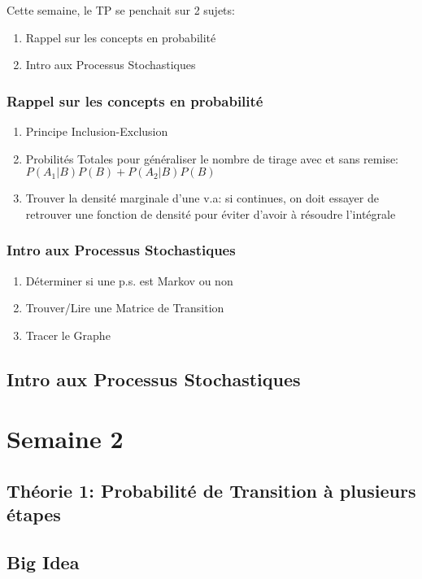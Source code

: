 \documentclass{article}
\begin{document}
Cette semaine, le TP se penchait sur 2 sujets:
\begin{enumerate}
    \item Rappel sur les concepts en probabilité
    \item Intro aux Processus Stochastiques
\end{enumerate}

\subsubsection{{Rappel sur les concepts en probabilité}}

\begin{enumerate}
    \item Principe Inclusion-Exclusion
    \item Probilités Totales pour généraliser le nombre de tirage avec et sans
	remise: $ P(A_1|B) P(B) + P(A_2|B)P(B) $
    \item Trouver la densité marginale d'une v.a: si continues, on doit essayer
	de retrouver une fonction de densité pour éviter d'avoir à résoudre
	l'intégrale
\end{enumerate}

\subsubsection{Intro aux Processus Stochastiques}

\begin{enumerate}
    \item Déterminer si une p.s. est Markov ou non
    \item Trouver/Lire une Matrice de Transition
    \item Tracer le Graphe
\end{enumerate}

\subsection{Intro aux Processus Stochastiques}

\pagebreak

\section{Semaine 2}
\subsection{Théorie 1: Probabilité de Transition à plusieurs étapes}
\subsection*{Big Idea}
\end{document}
